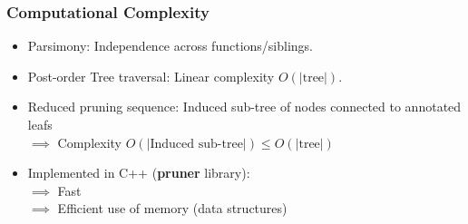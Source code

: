 \documentclass[aspectratio=169, 9pt, handout]{beamer}
\begin{document}
\begin{frame}
	\frametitle{Computational Complexity}
	\begin{minipage}[m]{.55\linewidth}
		\small
	\pause
	\begin{itemize}
		\item Parsimony: Independence across functions/siblings.\pause
		\item Post-order Tree traversal: Linear complexity $O(|\mbox{tree}|)$.
	\end{itemize}
\pause
	\pause
	\begin{itemize}
		\item Reduced pruning sequence: Induced sub-tree of nodes connected to annotated leafs\\ $\implies$ Complexity $O(\left|\mbox{Induced sub-tree}\right|)\leq O(|\mbox{tree}|)$\pause
		\item Implemented in C++ (\textbf{pruner} library):\\\pause
		$\implies$ Fast \\\pause
		$\implies$ Efficient use of memory (data structures)
	\end{itemize}
	\end{minipage}\hfill
\begin{minipage}[m]{.44\linewidth}
	\centering
\end{minipage}
\end{frame}
\end{document}
